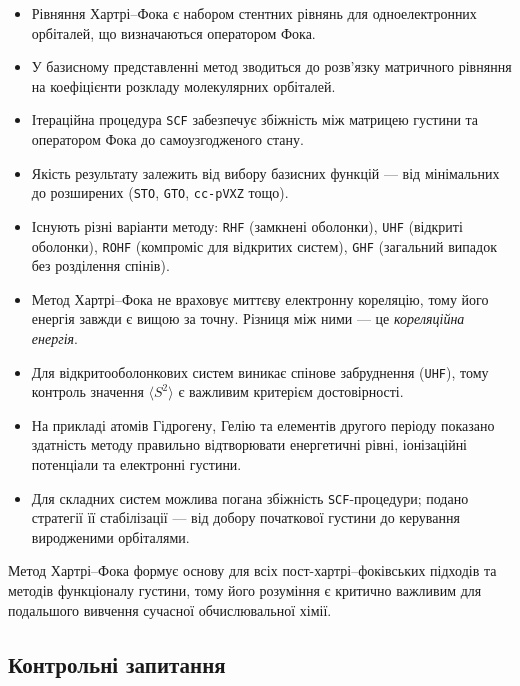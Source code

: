 \begin{itemize}
    \item Рівняння Хартрі--Фока є набором стентних рівнянь для одноелектронних орбіталей, що визначаються оператором Фока.
    \item У базисному представленні метод зводиться до розв’язку матричного рівняння на коефіцієнти розкладу молекулярних орбіталей.
    \item Ітераційна процедура \texttt{SCF} забезпечує збіжність між матрицею густини та оператором Фока до самоузгодженого стану.
    \item Якість результату залежить від вибору базисних функцій --- від мінімальних до розширених (\texttt{STO}, \texttt{GTO}, \texttt{cc-pVXZ} тощо).
    \item Існують різні варіанти методу: \texttt{RHF} (замкнені оболонки), \texttt{UHF} (відкриті оболонки), \texttt{ROHF} (компроміс для відкритих систем), \texttt{GHF} (загальний випадок без розділення спінів).
    \item Метод Хартрі--Фока не враховує миттєву електронну кореляцію, тому його енергія завжди є вищою за точну. Різниця між ними --- це \textit{кореляційна енергія}.
    \item Для відкритооболонкових систем виникає спінове забруднення (\texttt{UHF}), тому контроль значення $\langle S^2 \rangle$ є важливим критерієм достовірності.
    \item На прикладі атомів Гідрогену, Гелію та елементів другого періоду показано здатність методу правильно відтворювати енергетичні рівні, іонізаційні потенціали та електронні густини.
    \item Для складних систем можлива погана збіжність \texttt{SCF}-процедури; подано стратегії її стабілізації --- від добору початкової густини до керування виродженими орбіталями.
\end{itemize}

Метод Хартрі--Фока формує основу для всіх пост-хартрі--фоківських підходів та методів функціоналу густини, тому його розуміння є критично важливим для подальшого вивчення сучасної обчислювальної хімії.




\subsection*{Контрольні запитання}

